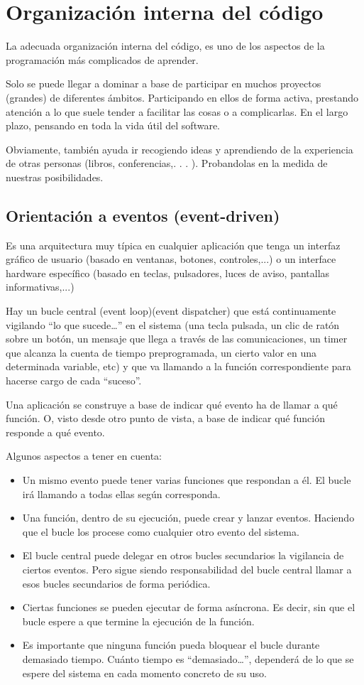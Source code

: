 \documentclass[spanish,12pt,a4paper,final,oneside]{book}
\begin{document}
\chapter{Organización interna del código}

La adecuada organización interna del código, es uno de los aspectos de la programación más complicados de aprender.

Solo se puede llegar a dominar a base de participar en muchos proyectos (grandes) de diferentes ámbitos. Participando en ellos de forma activa, prestando atención a lo que suele tender a facilitar las cosas o a complicarlas. En el largo plazo, pensando en toda la vida útil del software.

Obviamente, también ayuda ir recogiendo ideas y aprendiendo de la experiencia de otras personas (libros, conferencias,. . . ). Probandolas en la medida de nuestras posibilidades.

\section{Orientación a eventos (event-driven)}\label{eventos}
Es una arquitectura muy típica en cualquier aplicación que tenga un interfaz gráfico de usuario (basado en ventanas, botones, controles,...) o un interface hardware específico (basado en teclas, pulsadores, luces de aviso, pantallas informativas,...)

Hay un bucle central (event loop)(event dispatcher) que está continuamente vigilando ``lo que sucede\ldots'' en el sistema (una tecla pulsada, un clic de ratón sobre un botón, un mensaje que llega a través de las comunicaciones, un timer que alcanza la cuenta de tiempo preprogramada, un cierto valor en una determinada variable, etc) y que va llamando a la función correspondiente para hacerse cargo de cada ``suceso''.

Una aplicación se construye a base de indicar qué evento ha de llamar a qué función. O, visto desde otro punto de vista, a base de indicar qué función responde a qué evento.

Algunos aspectos a tener en cuenta:
\begin{itemize}
\item Un mismo evento puede tener varias funciones que respondan a él. El bucle irá llamando a todas ellas según corresponda.
\item Una función, dentro de su ejecución, puede crear y lanzar eventos. Haciendo que el bucle los procese como cualquier otro evento del sistema.
\item El bucle central puede delegar en otros bucles secundarios la vigilancia de ciertos eventos. Pero sigue siendo responsabilidad del bucle central llamar a esos bucles secundarios de forma periódica.
\item Ciertas funciones se pueden ejecutar de forma asíncrona. Es decir, sin que el bucle espere a que termine la ejecución de la función.
\item Es importante que ninguna función pueda bloquear el bucle durante demasiado tiempo. Cuánto tiempo es ``demasiado\ldots'', dependerá de lo que se espere del sistema en cada momento concreto de su uso.
\end{itemize}
\end{document}
